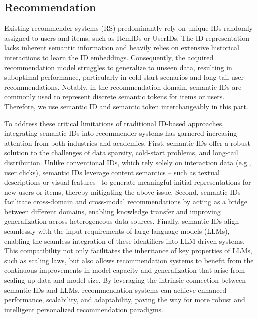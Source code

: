 \subsection{Recommendation}


Existing recommender systems (RS) predominantly rely on unique IDs randomly assigned to users and items, such as ItemIDs or UserIDs. The ID representation lacks inherent semantic information and heavily relies on extensive historical interactions to learn the ID embeddings.
Consequently, the acquired recommendation model struggles to generalize to unseen data, resulting in suboptimal performance, particularly in cold-start scenarios and long-tail user recommendations. Notably, in the recommendation domain, semantic IDs are commonly used to represent discrete semantic tokens for items or users. Therefore, we use semantic ID and semantic token interchangeably in this part.

To address these critical limitations of traditional ID-based approaches, integrating semantic IDs into recommender systems has garnered increasing attention from both industries and academics.
First, semantic IDs offer a robust solution to the challenges of data sparsity, cold-start problems, and long-tail distribution. Unlike conventional IDs, which rely solely on interaction data (e.g., user clicks), semantic IDs leverage content semantics -- such as textual descriptions or visual features --to generate meaningful initial representations for new users or items, thereby mitigating the above issue. 
Second, semantic IDs facilitate cross-domain and cross-modal recommendations by acting as a bridge between different domains, enabling knowledge transfer and improving generalization across heterogeneous data sources. 
Finally, semantic IDs align seamlessly with the input requirements of large language models (LLMs), enabling the seamless integration of these identifiers into LLM-driven systems. This compatibility not only facilitates the inheritance of key properties of LLMs, such as scaling laws, but also allows recommendation systems to benefit from the continuous improvements in model capacity and generalization that arise from scaling up data and model size. By leveraging the intrinsic connection between semantic IDs and LLMs, recommendation systems can achieve enhanced performance, scalability, and adaptability, paving the way for more robust and intelligent personalized recommendation paradigms.

